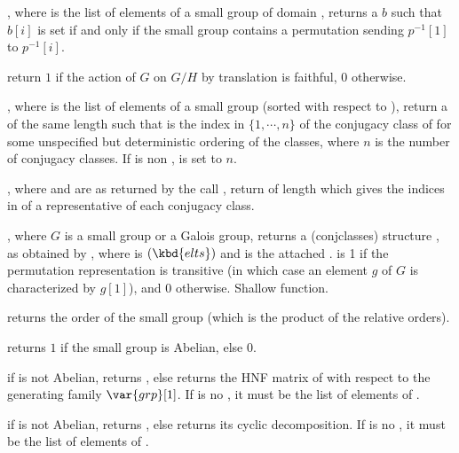 , where  is the list of
elements of a small group of domain , returns a  $b$ such that
$b[i]$ is set if and only if the small group contains a permutation sending
$p^{-1}[1]$ to $p^{-1}[i]$.

 return $1$ if the action
of $G$ on $G/H$ by translation is faithful, $0$ otherwise.

, where  is
the list of elements of a small group (sorted with respect to
), return a   of
the same length such that  is the index in $\{1,\cdots,n\}$  of
the conjugacy class of  for some unspecified but deterministic
ordering of the classes, where $n$ is the number of conjugacy classes. If
 is non ,  is set to $n$.

,
where  and  are as returned by the call
, return  of length 
which gives the indices in  of a representative of each conjugacy
class.

, where $G$ is a small group or a Galois group,
returns a  (conjclasses) structure ,
 as obtained by , where  is
$(\kbd{elts})$ and  is the attached
.  is 1 if the permutation representation
is transitive (in which case an element $g$ of $G$ is characterized by $g[1]$),
and 0 otherwise. Shallow function.

 returns the order of the small group
 (which is the product of the relative orders).

 returns $1$ if the small group
 is Abelian, else $0$.

 if  is not Abelian,
returns , else returns the HNF matrix of  with respect to
the generating family $\var{grp}[1]$. If  is no , it must
be the list of elements of .

 if  is not Abelian,
returns , else returns its cyclic decomposition. If  is no
, it must be the list of elements of .

